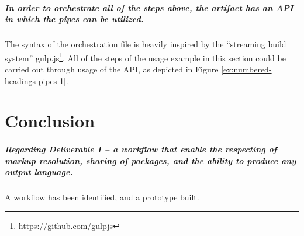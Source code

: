 \documentclass{scrreprt}
\begin{document}
\paragraph{In order to orchestrate all of the steps above, the artifact has an API in which the pipes can be utilized.} The syntax of the orchestration file is heavily inspired by the ``streaming build system'' gulp.js\footnote{https://github.com/gulpjs}. All of the steps of the usage example in this section could be carried out through usage of the API, as depicted in Figure \ref{ex:numbered-headings-pipes-1}.

























%
%
%
%
%
%

\chapter{Conclusion}

\paragraph{Regarding Deliverable I -- a workflow that enable the respecting of markup resolution, sharing of packages, and the ability to produce any output language. } A workflow has been identified, and a prototype built.
\end{document}
